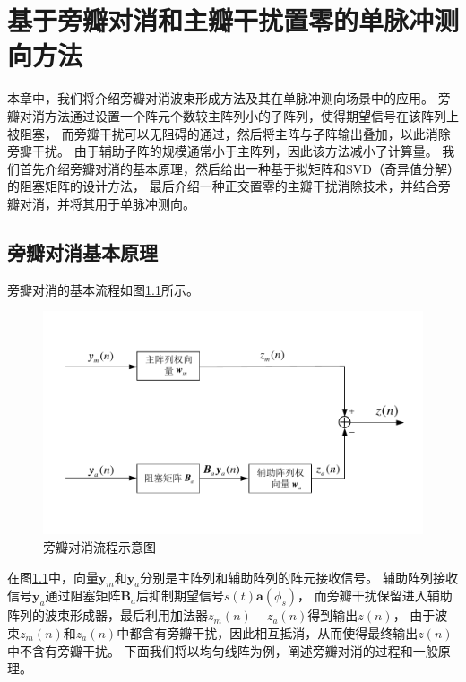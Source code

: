 \documentclass[master]{thesis-uestc}
\begin{document}
\chapter{基于旁瓣对消和主瓣干扰置零的单脉冲测向方法}
本章中，我们将介绍旁瓣对消波束形成方法及其在单脉冲测向场景中的应用。
旁瓣对消方法通过设置一个阵元个数较主阵列小的子阵列，使得期望信号在该阵列上被阻塞，
而旁瓣干扰可以无阻碍的通过，然后将主阵与子阵输出叠加，以此消除旁瓣干扰。
由于辅助子阵的规模通常小于主阵列，因此该方法减小了计算量。
我们首先介绍旁瓣对消的基本原理，然后给出一种基于拟矩阵和SVD（奇异值分解）的阻塞矩阵的设计方法，
最后介绍一种正交置零的主瓣干扰消除技术，并结合旁瓣对消，并将其用于单脉冲测向。

\section{旁瓣对消基本原理}
旁瓣对消的基本流程如图\ref{GSC_process}所示。
\begin{figure}[h]
    \includegraphics[scale=0.8]{pic/GSC_process.pdf}
    \caption{旁瓣对消流程示意图}
    \label{GSC_process}
\end{figure}
在图\ref{GSC_process}中，向量$\bm{y}_m$和$\bm{y}_a$分别是主阵列和辅助阵列的阵元接收信号。
辅助阵列接收信号$\bm{y}_a$通过阻塞矩阵$\bm{B}_a$后抑制期望信号$s(t)\bm{a}(\phi_s)$，
而旁瓣干扰保留进入辅助阵列的波束形成器，最后利用加法器$z_m(n)-z_a(n)$得到输出$z(n)$，
由于波束$z_m(n)$和$z_a(n)$中都含有旁瓣干扰，因此相互抵消，从而使得最终输出$z(n)$中不含有旁瓣干扰。
下面我们将以均匀线阵为例，阐述旁瓣对消的过程和一般原理。
\end{document}
